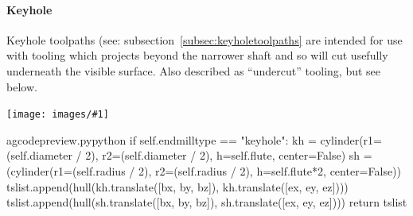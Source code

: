 \documentclass{ltxdoc}
\newcommand{\includeimage}[1]{\bigskip\noindent\texttt{[image: images/\#1]}\bigskip}
\begin{document}
\paragraph{Keyhole}

Keyhole toolpaths (see: subsection~\ref{subsec:keyholetoolpaths} are intended for use with tooling which projects beyond the narrower shaft and so will cut usefully underneath the visible surface. Also described as ``undercut'' tooling, but see below.

\includeimage{keyhole_router_bits.pdf}%

%
%
%

\lstset{firstnumber=\thegcpy}
\begin{writecode}{a}{gcodepreview.py}{python}
        if self.endmilltype == "keyhole":
            kh = cylinder(r1=(self.diameter / 2), r2=(self.diameter / 2), h=self.flute, center=False)
            sh = (cylinder(r1=(self.radius / 2), r2=(self.radius / 2), h=self.flute*2, center=False))
            tslist.append(hull(kh.translate([bx, by, bz]), kh.translate([ex, ey, ez])))
            tslist.append(hull(sh.translate([bx, by, bz]), sh.translate([ex, ey, ez])))
            return tslist

\end{writecode}
\addtocounter{gcpy}{7}

%
%
%
%
\end{document}
